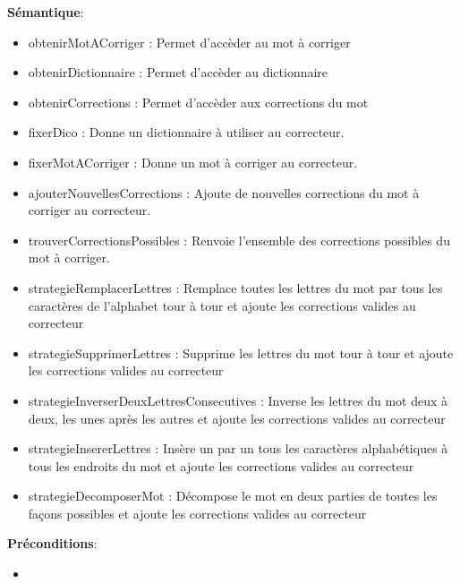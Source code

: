 \documentclass{article}
\begin{document}
    \textbf{Sémantique}: \begin{itemize}[label=$\- $, leftmargin=2cm, itemsep=0cm]
        \item obtenirMotACorriger : Permet d'accèder au mot à corriger 
        \item obtenirDictionnaire : Permet d'accèder au dictionnaire 
        \item obtenirCorrections : Permet d'accèder aux corrections du mot
        \item fixerDico : Donne un dictionnaire à utiliser au correcteur.
        \item fixerMotACorriger : Donne un mot à corriger au correcteur.
        \item ajouterNouvellesCorrections : Ajoute de nouvelles corrections du mot à corriger au correcteur.
        \item trouverCorrectionsPossibles : Renvoie l'ensemble des corrections possibles du mot à corriger.
        \item strategieRemplacerLettres : Remplace toutes les lettres du mot par tous les caractères de l'alphabet tour à tour et ajoute les corrections valides au correcteur
        \item strategieSupprimerLettres : Supprime les lettres du mot tour à tour et ajoute les corrections valides au correcteur
        \item strategieInverserDeuxLettresConsecutives : Inverse les lettres du mot deux à deux, les unes après les autres et ajoute les corrections valides au correcteur
        \item strategieInsererLettres : Insère un par un tous les caractères alphabétiques à tous les endroits du mot et ajoute les corrections valides au correcteur
        \item strategieDecomposerMot : Décompose le mot en deux parties de toutes les façons possibles et ajoute les corrections valides au correcteur
    \end{itemize}
        
    \textbf{Préconditions}: \begin{itemize}[label=$\- $, leftmargin=2cm, itemsep=0cm]
        \item
    \end{itemize}
\end{document}

